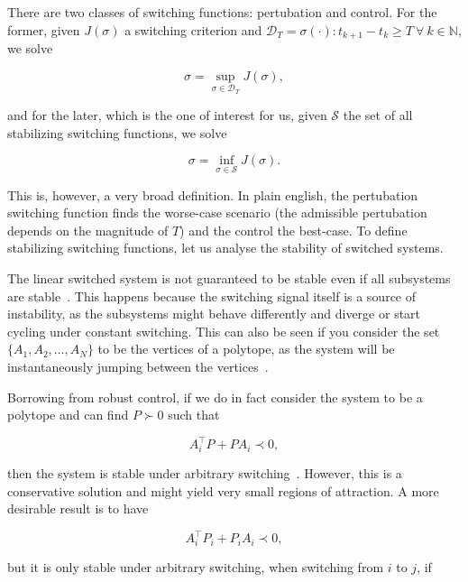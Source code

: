There are two classes of switching functions: pertubation and control. For the
former, given \(J(\sigma)\) a switching criterion and
\(\mathcal{D}_{T}=\sigma(\cdot):t_{k+1}-t_{k}\ge{}T~\forall{}~k\in{}\mathbb{N}\), we solve

\begin{equation}
  \sigma = \sup_{\sigma\in\mathcal{D}_{T}} J(\sigma),
\end{equation}

and for the later, which is the one of interest for us, given \(\mathcal{S}\)
the set of all stabilizing switching functions, we solve

\begin{equation}
  \sigma = \inf_{\sigma\in\mathcal{S}} J(\sigma).
\end{equation}

This is, however, a very broad definition. In plain english, the pertubation
switching function finds the worse-case scenario (the admissible pertubation
depends on the magnitude of \(T\)) and the control the best-case. To define
stabilizing switching functions, let us analyse the stability of switched
systems.

The linear switched system is not guaranteed to be stable even if all subsystems
are stable~\parencite{liberzon.morse:basic}. This happens because the switching
signal itself is a source of instability, as the subsystems might behave
differently and diverge or start cycling under constant switching. This can also
be seen if you consider the set \(\{A_{1}, A_{2}, \ldots, A_{N}\}\) to be the
vertices of a polytope, as the system will be instantaneously jumping between
the vertices~\parencite{geromel.colaneri:stabilization}.

Borrowing from robust control, if we do in fact consider the system to be a
polytope and can find \(P\succ{}0\) such that

\begin{equation}
  A_{i}^{\top}P+PA_{i} \prec{} 0,
\end{equation}

then the system is stable under arbitrary
switching~\parencite{geromel.deaecto:stability}. However, this is a conservative
solution and might yield very small regions of attraction. A more desirable
result is to have

\begin{equation}
  A_{i}^{\top}P_{i}+P_{i}A_{i} \prec{} 0,
\end{equation}

but it is only stable under arbitrary switching, when switching from \(i\) to
\(j\), if

